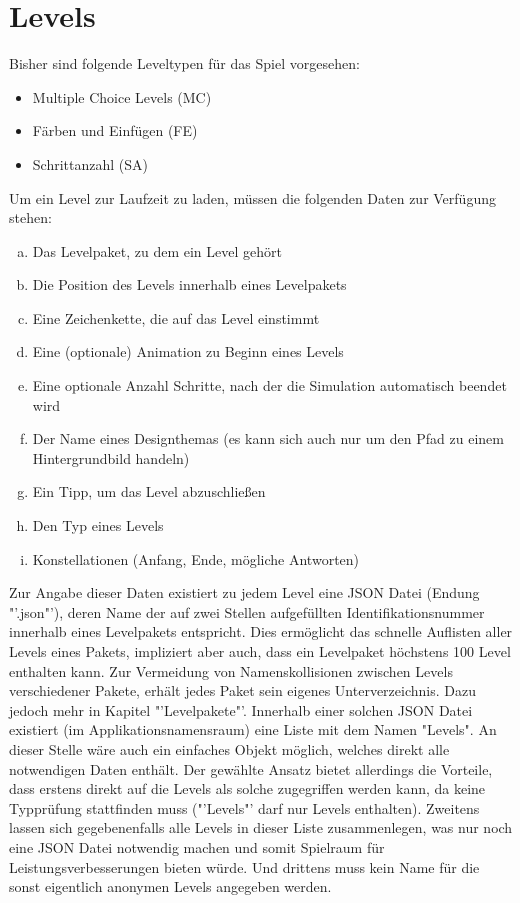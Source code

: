 \section{Levels}
Bisher sind folgende Leveltypen für das Spiel vorgesehen:
\begin{itemize}
	\item Multiple Choice Levels (MC)
	\item Färben und Einfügen (FE)
	\item Schrittanzahl (SA)
\end{itemize}
Um ein Level zur Laufzeit zu laden, müssen die folgenden Daten zur Verfügung stehen:
\begin{enumerate}[a)]
	\item Das Levelpaket, zu dem ein Level gehört
	\item Die Position des Levels innerhalb eines Levelpakets
	\item Eine Zeichenkette, die auf das Level einstimmt
	\item Eine (optionale) Animation zu Beginn eines Levels
	\item Eine optionale Anzahl Schritte, nach der die Simulation automatisch beendet wird
	\item Der Name eines Designthemas (es kann sich auch nur um den Pfad zu einem Hintergrundbild handeln)
	\item Ein Tipp, um das Level abzuschließen
	\item Den Typ eines Levels
	\item Konstellationen (Anfang, Ende, mögliche Antworten)
\end{enumerate}
Zur Angabe dieser Daten existiert zu jedem Level eine JSON Datei (Endung "'.json"'), deren Name der auf zwei Stellen aufgefüllten Identifikationsnummer innerhalb eines Levelpakets entspricht.
Dies ermöglicht das schnelle Auflisten aller Levels eines Pakets, impliziert aber auch, dass ein Levelpaket höchstens 100 Level enthalten kann.
Zur Vermeidung von Namenskollisionen zwischen Levels verschiedener Pakete, erhält jedes Paket sein eigenes Unterverzeichnis.
Dazu jedoch mehr in Kapitel "'Levelpakete"'.
Innerhalb einer solchen JSON Datei existiert (im Applikationsnamensraum) eine Liste mit dem Namen "Levels".
An dieser Stelle wäre auch ein einfaches Objekt möglich, welches direkt alle notwendigen Daten enthält.
Der gewählte Ansatz bietet allerdings die Vorteile, dass erstens direkt auf die Levels als solche zugegriffen werden kann, da keine Typprüfung stattfinden muss ("'Levels"' darf nur Levels enthalten).
Zweitens lassen sich gegebenenfalls alle Levels in dieser Liste zusammenlegen, was nur noch eine JSON Datei notwendig machen und somit Spielraum für Leistungsverbesserungen bieten würde.
Und drittens muss kein Name für die sonst eigentlich anonymen Levels angegeben werden.


